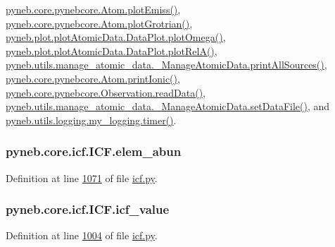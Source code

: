 \hyperlink{pynebcore_8py_source_l02384}{pyneb.\-core.\-pynebcore.\-Atom.\-plot\-Emiss()}, \hyperlink{pynebcore_8py_source_l02443}{pyneb.\-core.\-pynebcore.\-Atom.\-plot\-Grotrian()}, \hyperlink{plot_atomic_data_8py_source_l00373}{pyneb.\-plot.\-plot\-Atomic\-Data.\-Data\-Plot.\-plot\-Omega()}, \hyperlink{plot_atomic_data_8py_source_l00262}{pyneb.\-plot.\-plot\-Atomic\-Data.\-Data\-Plot.\-plot\-Rel\-A()}, \hyperlink{manage__atomic__data_8py_source_l00431}{pyneb.\-utils.\-manage\-\_\-atomic\-\_\-data.\-\_\-\-Manage\-Atomic\-Data.\-print\-All\-Sources()}, \hyperlink{pynebcore_8py_source_l02233}{pyneb.\-core.\-pynebcore.\-Atom.\-print\-Ionic()}, \hyperlink{pynebcore_8py_source_l03711}{pyneb.\-core.\-pynebcore.\-Observation.\-read\-Data()}, \hyperlink{manage__atomic__data_8py_source_l00380}{pyneb.\-utils.\-manage\-\_\-atomic\-\_\-data.\-\_\-\-Manage\-Atomic\-Data.\-set\-Data\-File()}, and \hyperlink{logging_8py_source_l00115}{pyneb.\-utils.\-logging.\-my\-\_\-logging.\-timer()}.

\hypertarget{classpyneb_1_1core_1_1icf_1_1_i_c_f_a59ea6760bd6a09a66dc47b47bcec55c0}{
\subsubsection[{elem\-\_\-abun}]{\setlength{\rightskip}{0pt plus 5cm}pyneb.\-core.\-icf.\-I\-C\-F.\-elem\-\_\-abun}}\label{classpyneb_1_1core_1_1icf_1_1_i_c_f_a59ea6760bd6a09a66dc47b47bcec55c0}


Definition at line \hyperlink{icf_8py_source_l01071}{1071} of file \hyperlink{icf_8py_source}{icf.\-py}.

\hypertarget{classpyneb_1_1core_1_1icf_1_1_i_c_f_a9dedc0eb2ad90ea08b8be9984e2d832b}{
\subsubsection[{icf\-\_\-value}]{\setlength{\rightskip}{0pt plus 5cm}pyneb.\-core.\-icf.\-I\-C\-F.\-icf\-\_\-value}}\label{classpyneb_1_1core_1_1icf_1_1_i_c_f_a9dedc0eb2ad90ea08b8be9984e2d832b}


Definition at line \hyperlink{icf_8py_source_l01004}{1004} of file \hyperlink{icf_8py_source}{icf.\-py}.


